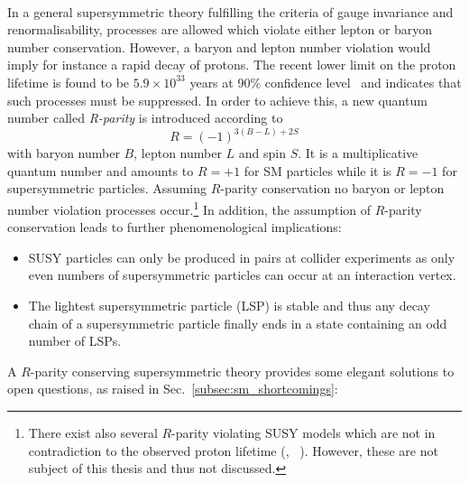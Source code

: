\\
In a general supersymmetric theory fulfilling the criteria of gauge invariance and renormalisability, processes are allowed which violate either lepton or baryon number conservation. However, a baryon and lepton number violation would imply for instance a rapid decay of protons. The recent lower limit on the proton lifetime is found to be $5.9 \times 10^{33}$ years at 90\% confidence level~\cite{PhysRevD.90.072005} and indicates that such processes must be suppressed. In order to achieve this, a new quantum number called \textit{R-parity} is introduced according to  
\begin{equation*}
R = (-1)^{3(B-L) + 2S}
\end{equation*}
with baryon number $B$, lepton number $L$ and spin $S$. It is a multiplicative quantum number and amounts to $R= +1$ for SM particles while it is $R = -1$ for supersymmetric particles. Assuming $R$-parity conservation no baryon or lepton number violation processes occur.\footnote{There exist also several $R$-parity violating SUSY models which are not in contradiction to the observed proton lifetime (\cf, \eg~\cite{Martin:1997ns}). However, these are not subject of this thesis and thus not discussed.} In addition, the assumption of $R$-parity conservation leads to further phenomenological implications:
\begin{itemize}
\item SUSY particles can only be produced in pairs at collider experiments as only even numbers of supersymmetric particles can occur at an interaction vertex.
\item The lightest supersymmetric particle (LSP) is stable and thus any decay chain of a supersymmetric particle finally ends in a state containing an odd number of LSPs.
\end{itemize}
A $R$-parity conserving supersymmetric theory provides some elegant solutions to open questions, as raised in Sec.~\ref{subsec:sm_shortcomings}:
